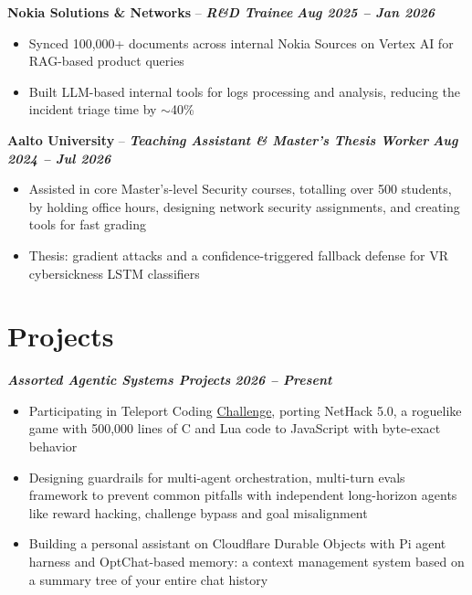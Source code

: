 \documentclass[11pt,a4paper]{article}
\newcommand{\experienceheader}[3]{%
    \Needspace{7\baselineskip}%
    \noindent\textbf{#1} -- \textbf{\textit{#2}} \hfill \textbf{\textit{#3}}%
}
\newcommand{\projectheader}[2]{%
    \Needspace{7\baselineskip}%
    \noindent\textbf{\textit{#1}} \hfill \textbf{\textit{#2}}%
}
\begin{document}
\vspace{3pt}

\experienceheader{Nokia Solutions \& Networks}{R\&D Trainee}{Aug 2025 -- Jan 2026}
\begin{itemize}
    \item Synced 100,000+ documents across internal Nokia Sources on Vertex AI for RAG-based product queries
    \item Built LLM-based internal tools for logs processing and analysis, reducing the incident triage time by $\sim$40\%
\end{itemize}

\vspace{3pt}

\experienceheader{Aalto University}{Teaching Assistant \& Master's Thesis Worker}{Aug 2024 -- Jul 2026}
\begin{itemize}
    \item Assisted in core Master's-level Security courses, totalling over 500 students, by holding office hours, designing network security assignments, and creating tools for fast grading
    \item Thesis: gradient attacks and a confidence-triggered fallback defense for VR cybersickness LSTM classifiers
\end{itemize}

\section{Projects}

\projectheader{Assorted Agentic Systems Projects}{2026 -- Present}
\begin{itemize}
    \item Participating in Teleport Coding \href{https://mazesofmenace.ai/}{Challenge}, porting NetHack 5.0, a roguelike game with 500,000 lines of C and Lua code to JavaScript with byte-exact behavior
    \item Designing guardrails for multi-agent orchestration, multi-turn evals framework to prevent common pitfalls with independent long-horizon agents like reward hacking, challenge bypass and goal misalignment
    \item Building a personal assistant on Cloudflare Durable Objects with Pi agent harness and OptChat-based memory: a context management system based on a summary tree of your entire chat history
\end{itemize}

\vspace{3pt}
\end{document}
